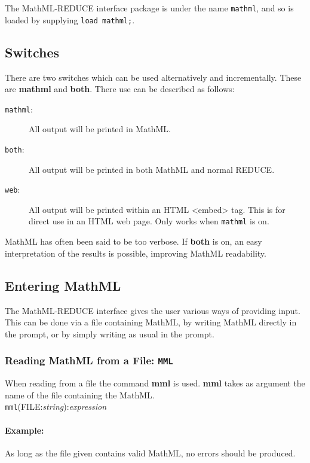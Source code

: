 \documentclass{article}
\begin{document}
The MathML-REDUCE interface package is under the name {\tt mathml}, and so is
loaded by supplying {\tt load mathml;}.

\subsection{Switches}

There are two switches which can be used alternatively and incrementally.
These are {\bf mathml} and {\bf both}. There use can be described as
follows:

\begin{description}
\item[{\tt mathml}:] All output will be printed in MathML.
\item[{\tt both}:] All output will be printed in both MathML and normal
REDUCE.
\item[{\tt web}:] All output will be printed within an HTML <embed> tag. This is
for direct use in an HTML web page. Only works when {\tt mathml} is on.
\end{description}

MathML has often been said to be too verbose. If {\bf both} is on, an easy
interpretation of the results is possible, improving MathML readability.

\subsection{Entering MathML}

The MathML-REDUCE interface gives the user various ways of providing input.
This can be done via a file containing MathML, by writing MathML directly
in the prompt, or by simply writing as usual in the prompt. \\

\subsubsection{Reading MathML from a File: {\tt MML}}

When reading from a file the command {\bf mml} is used. {\bf mml} takes as
argument the name of the file containing the MathML. \\

{\tt mml}(FILE:{\it string}):{\it expression} 

\paragraph{Example:} As long as the file given contains valid MathML, no
errors should be produced.  
\end{document}

